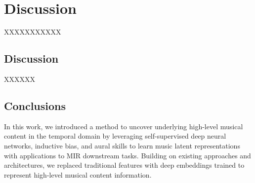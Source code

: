 \chapter{Discussion}

XXXXXXXXXXX

\section{Discussion}

XXXXXX

\section{Conclusions}

In this work, we introduced a method to uncover underlying high-level musical
content in the temporal domain by leveraging self-supervised deep neural networks, inductive bias, and aural skills to learn music latent representations with applications to MIR downstream tasks. Building on existing approaches and architectures, we replaced traditional features with deep embeddings trained to represent high-level musical content information.


\newpage


